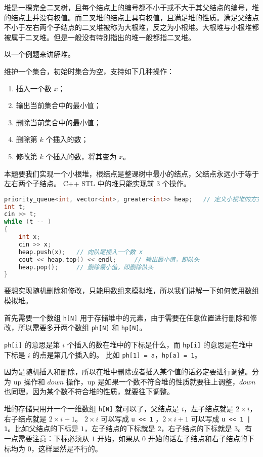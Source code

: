 
堆是一棵完全二叉树，且每个结点上的编号都不小于或不大于其父结点的编号，堆的结点上并没有权值。而二叉堆的结点上具有权值，且满足堆的性质。满足父结点不小于左右两个子结点的二叉堆被称为大根堆，反之为小根堆。大根堆与小根堆都被属于二叉堆。但是一般没有特别指出的堆一般都指二叉堆。

以一个例题来讲解堆。

维护一个集合，初始时集合为空，支持如下几种操作：
\begin{enumerate}
\item 插入一个数 $x$；
\item 输出当前集合中的最小值；
\item 删除当前集合中的最小值；
\item 删除第 $k$ 个插入的数；
\item 修改第 $k$ 个插入的数，将其变为 $x$。
\end{enumerate}

本题要我们实现一个小根堆，根结点是整课树中最小的结点，父结点永远小于等于左右两个子结点。
C++ STL 中的堆只能实现前 $3$ 个操作。
\begin{lstlisting}[language=cpp]
priority_queue<int, vector<int>, greater<int>> heap;   // 定义小根堆的方式
int t;
cin >> t;
while (t -- )
{
    int x;            
    cin >> x;
    heap.push(x);   // 向队尾插入一个数 x
    cout << heap.top() << endl;     // 输出最小值，即队头
    heap.pop();     // 删除最小值，即删除队头
}
\end{lstlisting}

要想实现随机删除和修改，只能用数组来模拟堆，所以我们讲解一下如何使用数组模拟堆。

首先需要一个数组 \verb|h[N]| 用于存储堆中的元素，由于需要在任意位置进行删除和修改，所以需要多开两个数组 \verb|ph[N]| 和 \verb|hp[N]|。

\verb|ph[i]| 的意思是第 $i$ 个插入的数在堆中的下标是什么，而 \verb|hp[i]| 的意思是在堆中下标是 $i$ 的点是第几个插入的。
比如 \verb|ph[1] = a|，\verb|hp[a] = 1|。

因为是随机插入和删除，所以在堆中删除或者插入某个值的话必定要进行调整。分为 up 操作和 $down$ 操作，up 是如果一个数不符合堆的性质就要往上调整，$down$ 也同理，因为某个数不符合堆的性质，就要往下调整。

堆的存储只用开一个一维数组 \verb|h[N]| 就可以了，父结点是 $i$，左子结点就是 $2 \times i$，右子结点就是 $2 \times i + 1$。
$2 \times i$ 可以写成 \verb|u << 1| ，$2 \times i + 1$ 可以写成 \verb?u << 1 | 1?。比如父结点的下标是 $1$，左子结点的下标就是 $2$，右子结点的下标就是 $3$。有一点需要注意：下标必须从 $1$ 开始，如果从 $0$ 开始的话左子结点和右子结点的下标均为 $0$，这样显然是不行的。

